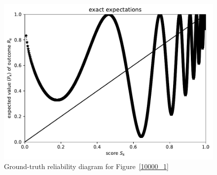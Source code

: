\documentclass{article}
\begin{document}
\begin{figure}
\begin{centering}

\parbox{\imsize}{\includegraphics[width=\imsize]
                {./codes/unweighted/10000_10_2_1/exact.pdf}}

\end{centering}
\caption{Ground-truth reliability diagram for Figure~\ref{10000_1}}
\label{10000_1e}
\end{figure}
\end{document}

